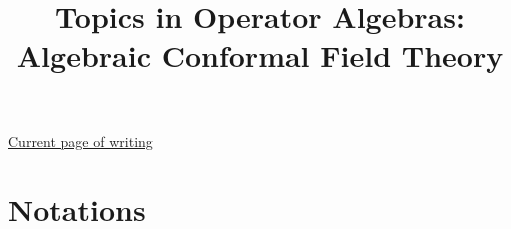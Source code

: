 \documentclass[12pt,b5paper,notitlepage]{article}
\title{Topics in Operator Algebras: Algebraic Conformal Field Theory}
\author{\sc{ Bin Gui}
}
\date{}
\theoremstyle{definition}
\theoremstyle{plain}
\numberwithin{equation}{section}
\begin{document}
\sloppy %
	\setcounter{page}{1}



	









	
	\maketitle












	


\normalsize

\hyperlink{beforeindex}{Current page of writing}~~~~~~ 

\tableofcontents



\newpage


\section*{Notations}
\end{document}
